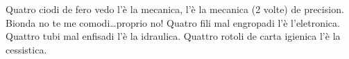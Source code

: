 \beginverse
Quatro ciodi de fero vedo l'è la mecanica,
l'è la mecanica (2 volte) de precision.
Bionda no te me comodi\dots proprio no!
Quatro fili mal engropadi l'è l'eletronica.
Quattro tubi mal enfisadi l'è la idraulica.
Quattro rotoli de carta igienica l'è la cessistica.
\endverse
\endsong
